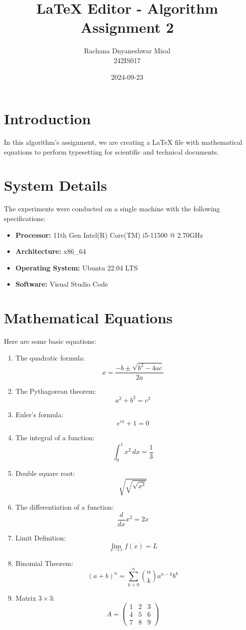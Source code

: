 \documentclass{article}
\begin{document}
\title{LaTeX Editor - Algorithm Assignment 2}
\author{Rachana Dnyaneshwar Misal \\ 242IS017}
\date{2024-09-23}
\maketitle

\section{Introduction}
In this algorithm's assignment, we are creating a LaTeX file with mathematical equations to perform typesetting for scientific and technical documents.

\section{System Details}
The experiments were conducted on a single machine with the following specifications:
\begin{itemize}
    \item \textbf{Processor:} 11th Gen Intel(R) Core(TM) i5-11500 @ 2.70GHz
    \item \textbf{Architecture:} x86\_64
    \item \textbf{Operating System:} Ubuntu 22.04 LTS
    \item \textbf{Software:} Visual Studio Code
\end{itemize}

\section{Mathematical Equations}
Here are some basic equations:
\begin{enumerate}
    \item The quadratic formula:
    \[
    x = \frac{-b \pm \sqrt{b^2 - 4ac}}{2a}
    \]
    \item The Pythagorean theorem:
    \[
    a^2 + b^2 = c^2
    \]
    \item Euler's formula:
    \[
    e^{i\pi} + 1 = 0
    \]
    \item The integral of a function:
    \[
    \int_0^1 x^2 \, dx = \frac{1}{3}
    \]
    \item Double square root:
    \[
    \sqrt{\sqrt{\sqrt{x^3}}}
    \]
    \item The differentiation of a function:
    \[
    \frac{d}{dx}x^2 = 2x
    \]
    \item Limit Definition:
    \[
    \lim_{x \to c} f(x) = L
    \]
    \item Binomial Theorem:
    \[
    (a + b)^n = \sum_{k=0}^{n} \binom{n}{k} a^{n-k} b^k
    \]
    \item Matrix \( 3 \times 3 \):
    \[
    A = \begin{pmatrix}
    1 & 2 & 3 \\
    4 & 5 & 6 \\
    7 & 8 & 9
    \end{pmatrix}
    \]
\end{enumerate}
\end{document}
